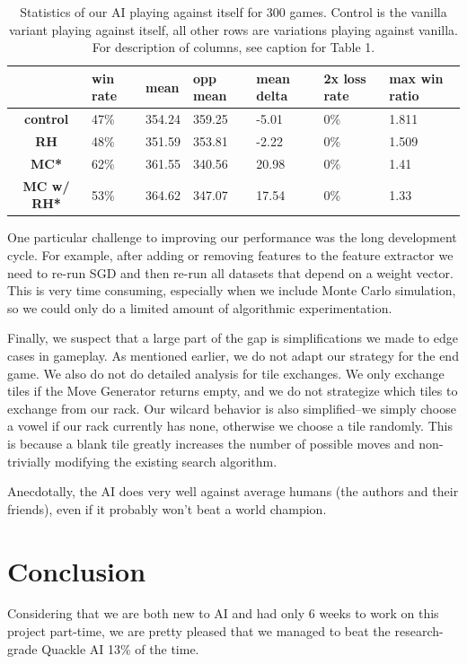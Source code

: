 \documentclass[12pt]{article}
\begin{document}
\begin{table}[h!]
  \centering
  \begin{tabular}{c|l|l|l|l|l|l}
    \textbf{} & \textbf{win rate} & \textbf{mean} & \textbf{opp mean} & \textbf{mean delta} &  \textbf{2x loss rate} & \textbf{max win ratio} \\\hline
  \textbf{control}   & 47\% & 354.24 & 359.25 & -5.01  & 0\%  & 1.811\\
  \textbf{RH}        & 48\% & 351.59 & 353.81 & -2.22  & 0\%  & 1.509\\
  \textbf{MC*}       & 62\% & 361.55 & 340.56 & 20.98  & 0\%  & 1.41 \\
  \textbf{MC w/ RH*} & 53\% & 364.62 & 347.07 & 17.54  & 0\%  & 1.33 \\
\end{tabular}
  \caption{Statistics of our AI playing against itself for 300
    games. Control is the vanilla variant playing against itself, all
    other rows are variations playing against vanilla. For description
    of columns, see caption for Table 1.}
\end{table}

One particular challenge to improving our performance was the long
development cycle. For example, after adding or removing features to
the feature extractor we need to re-run SGD and then re-run all
datasets that depend on a weight vector. This is very time consuming,
especially when we include Monte Carlo simulation, so we could only do
a limited amount of algorithmic experimentation.

Finally, we suspect that a large part of the gap is simplifications we
made to edge cases in gameplay. As mentioned earlier, we do not adapt
our strategy for the end game. We also do not do detailed analysis for
tile exchanges. We only exchange tiles if the Move Generator returns
empty, and we do not strategize which tiles to exchange from our
rack. Our wilcard behavior is also simplified--we simply choose a
vowel if our rack currently has none, otherwise we choose a tile
randomly. This is because a blank tile greatly increases the number of
possible moves and non-trivially modifying the existing search
algorithm.

Anecdotally, the AI does very well against average humans (the authors
and their friends), even if it probably won't beat a world champion.

\section*{Conclusion}
Considering that we are both new to AI and had only 6 weeks to work on
this project part-time, we are pretty pleased that we managed to beat
the research-grade Quackle AI 13\% of the time.
\end{document}
